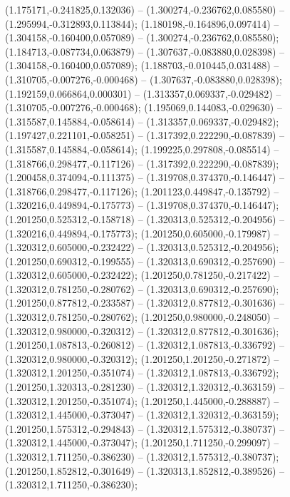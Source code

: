  (1.175171,-0.241825,0.132036) -- (1.300274,-0.236762,0.085580) -- (1.295994,-0.312893,0.113844);
 (1.180198,-0.164896,0.097414) -- (1.304158,-0.160400,0.057089) -- (1.300274,-0.236762,0.085580);
 (1.184713,-0.087734,0.063879) -- (1.307637,-0.083880,0.028398) -- (1.304158,-0.160400,0.057089);
 (1.188703,-0.010445,0.031488) -- (1.310705,-0.007276,-0.000468) -- (1.307637,-0.083880,0.028398);
 (1.192159,0.066864,0.000301) -- (1.313357,0.069337,-0.029482) -- (1.310705,-0.007276,-0.000468);
 (1.195069,0.144083,-0.029630) -- (1.315587,0.145884,-0.058614) -- (1.313357,0.069337,-0.029482);
 (1.197427,0.221101,-0.058251) -- (1.317392,0.222290,-0.087839) -- (1.315587,0.145884,-0.058614);
 (1.199225,0.297808,-0.085514) -- (1.318766,0.298477,-0.117126) -- (1.317392,0.222290,-0.087839);
 (1.200458,0.374094,-0.111375) -- (1.319708,0.374370,-0.146447) -- (1.318766,0.298477,-0.117126);
 (1.201123,0.449847,-0.135792) -- (1.320216,0.449894,-0.175773) -- (1.319708,0.374370,-0.146447);
 (1.201250,0.525312,-0.158718) -- (1.320313,0.525312,-0.204956) -- (1.320216,0.449894,-0.175773);
 (1.201250,0.605000,-0.179987) -- (1.320312,0.605000,-0.232422) -- (1.320313,0.525312,-0.204956);
 (1.201250,0.690312,-0.199555) -- (1.320313,0.690312,-0.257690) -- (1.320312,0.605000,-0.232422);
 (1.201250,0.781250,-0.217422) -- (1.320312,0.781250,-0.280762) -- (1.320313,0.690312,-0.257690);
 (1.201250,0.877812,-0.233587) -- (1.320312,0.877812,-0.301636) -- (1.320312,0.781250,-0.280762);
 (1.201250,0.980000,-0.248050) -- (1.320312,0.980000,-0.320312) -- (1.320312,0.877812,-0.301636);
 (1.201250,1.087813,-0.260812) -- (1.320312,1.087813,-0.336792) -- (1.320312,0.980000,-0.320312);
 (1.201250,1.201250,-0.271872) -- (1.320312,1.201250,-0.351074) -- (1.320312,1.087813,-0.336792);
 (1.201250,1.320313,-0.281230) -- (1.320312,1.320312,-0.363159) -- (1.320312,1.201250,-0.351074);
 (1.201250,1.445000,-0.288887) -- (1.320312,1.445000,-0.373047) -- (1.320312,1.320312,-0.363159);
 (1.201250,1.575312,-0.294843) -- (1.320312,1.575312,-0.380737) -- (1.320312,1.445000,-0.373047);
 (1.201250,1.711250,-0.299097) -- (1.320312,1.711250,-0.386230) -- (1.320312,1.575312,-0.380737);
 (1.201250,1.852812,-0.301649) -- (1.320313,1.852812,-0.389526) -- (1.320312,1.711250,-0.386230);

